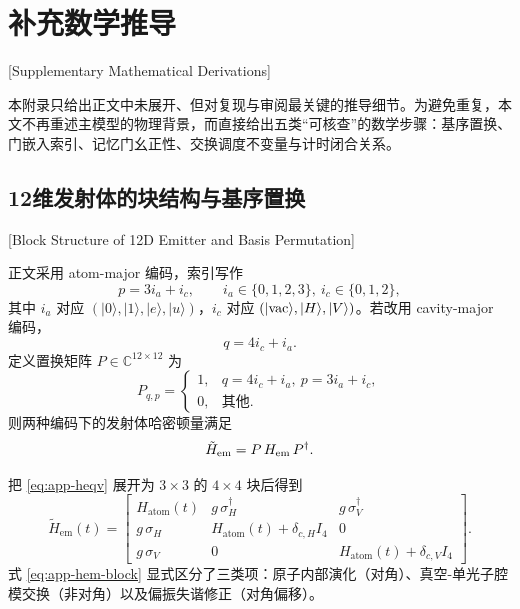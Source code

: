 \chapter{补充数学推导}[Supplementary Mathematical Derivations]

本附录只给出正文中未展开、但对复现与审阅最关键的推导细节。为避免重复，本文不再重述主模型的物理背景，而直接给出五类“可核查”的数学步骤：基序置换、门嵌入索引、记忆门幺正性、交换调度不变量与计时闭合关系。

\section{12维发射体的块结构与基序置换}[Block Structure of 12D Emitter and Basis Permutation]

正文采用 atom-major 编码，索引写作
\begin{equation}
p=3i_a+i_c,\qquad i_a\in\{0,1,2,3\},\ i_c\in\{0,1,2\},
\label{eq:app-index-atom-major}
\end{equation}
其中 $i_a$ 对应 $(|0\rangle,|1\rangle,|e\rangle,|u\rangle)$，$i_c$ 对应 $(|{\rm vac}\rangle,|H\rangle,|V\rangle)$。若改用 cavity-major 编码，
\begin{equation}
q=4i_c+i_a.
\label{eq:app-index-cavity-major}
\end{equation}
定义置换矩阵 $P\in\mathbb{C}^{12\times 12}$ 为
\begin{equation}
P_{q,p}=
\begin{cases}
1,& q=4i_c+i_a,\ p=3i_a+i_c,\\
0,& \text{其他}.
\end{cases}
\label{eq:app-perm}
\end{equation}
则两种编码下的发射体哈密顿量满足
\begin{equation}
\tilde H_{\rm em}=P\,H_{\rm em}\,P^\dagger.
\label{eq:app-heqv}
\end{equation}

把 \eqref{eq:app-heqv} 展开为 $3\times 3$ 的 $4\times 4$ 块后得到
\begin{equation}
\tilde H_{\mathrm{em}}(t)=
\begin{bmatrix}
H_{\mathrm{atom}}(t) & g\,\sigma_H^\dagger & g\,\sigma_V^\dagger\\
g\,\sigma_H & H_{\mathrm{atom}}(t)+\delta_{c,H}I_4 & 0\\
g\,\sigma_V & 0 & H_{\mathrm{atom}}(t)+\delta_{c,V}I_4
\end{bmatrix}.
\label{eq:app-hem-block}
\end{equation}
式 \eqref{eq:app-hem-block} 显式区分了三类项：原子内部演化（对角）、真空-单光子腔模交换（非对角）以及偏振失谐修正（对角偏移）。

